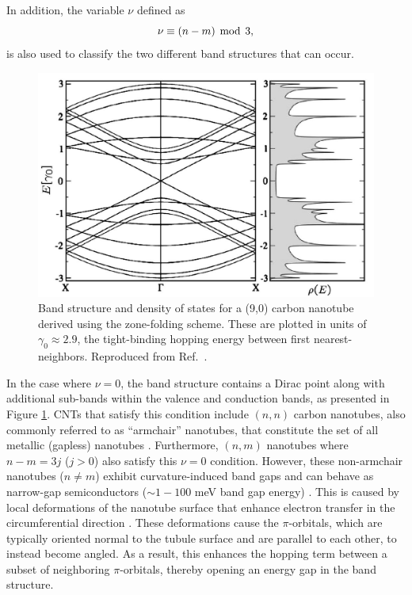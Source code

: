 In addition, the variable $\nu$ defined as
%
\begin{equation}
\label{eq:nu_cnt}
\nu \equiv (n-m) \mathrm{\hspace{1.5mm} mod \hspace{1.5mm}} 3,
\end{equation}
%
is also used to classify the two different band structures that can occur.
%
\begin{figure}[h]
	\centering
	\includegraphics[scale=0.3]{images/chapter_optical_props/nine_zero_band_charlier}
	\caption{Band structure and density of states for a (9,0) carbon nanotube derived using the zone-folding scheme. These are plotted in units of $\gamma_0 \approx 2.9$, the tight-binding hopping energy between first nearest-neighbors. Reproduced from Ref.\ \cite{charlier2007electronic}.}
	\label{fig:nine_zero_cnt}
\end{figure}
%
In the case where $\nu = 0 $, the band structure contains a Dirac point along with additional sub-bands within the valence and conduction bands, as presented in Figure \ref{fig:nine_zero_cnt}. CNTs that satisfy this condition include $(n,n)$ carbon nanotubes, also commonly referred to as ``armchair'' nanotubes, that constitute the set of all metallic (gapless) nanotubes \cite{nanot2012optoelectronic}. Furthermore, $(n,m)$ nanotubes where $n-m = 3j$ ($j > 0$) also satisfy this $\nu = 0$ condition. However, these non-armchair nanotubes ($n\neq m$) exhibit curvature-induced band gaps and can behave as narrow-gap semiconductors ($\sim1 - 100$ meV band gap energy) \cite{nanot2012optoelectronic}. This is caused by local deformations of the nanotube surface that enhance electron transfer in the circumferential direction   \cite{hamada1992new, kane1997size}. These deformations cause the $\pi$-orbitals, which are typically oriented normal to the tubule surface and are parallel to each other, to instead become angled. As a result, this enhances the hopping term between a subset of neighboring $\pi$-orbitals, thereby opening an energy gap in the band structure.

